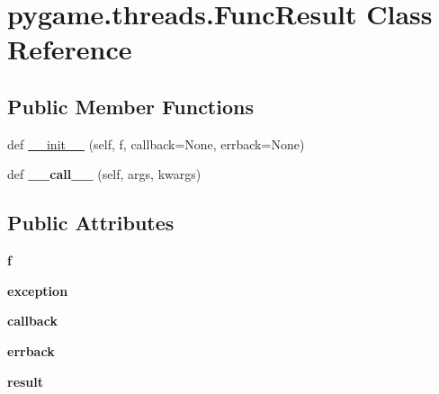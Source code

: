 \hypertarget{classpygame_1_1threads_1_1_func_result}{}\section{pygame.\+threads.\+Func\+Result Class Reference}
\label{classpygame_1_1threads_1_1_func_result}
\subsection*{Public Member Functions}
\begin{DoxyCompactItemize}
\item 
def \hyperlink{classpygame_1_1threads_1_1_func_result_a61e36edc69a58ba0101f7bf1930d62d0}{\+\_\+\+\_\+init\+\_\+\+\_\+} (self, f, callback=None, errback=None)
\item 
\mbox{\label{classpygame_1_1threads_1_1_func_result_a30e5c2698d1765c925e01e44e39acbe7}} 
def {\bfseries \+\_\+\+\_\+call\+\_\+\+\_\+} (self, args, kwargs)
\end{DoxyCompactItemize}
\subsection*{Public Attributes}
\begin{DoxyCompactItemize}
\item 
\mbox{\label{classpygame_1_1threads_1_1_func_result_ae352364c6aa2560303cec3dff9e649f9}} 
{\bfseries f}
\item 
\mbox{\label{classpygame_1_1threads_1_1_func_result_a9d31767c3ab7fe94c0e52719ee255172}} 
{\bfseries exception}
\item 
\mbox{\label{classpygame_1_1threads_1_1_func_result_a01af95e36cd5586fae33f9edcfcf11e2}} 
{\bfseries callback}
\item 
\mbox{\label{classpygame_1_1threads_1_1_func_result_a071d25f9f90d2d06aa718e8417dde1ad}} 
{\bfseries errback}
\item 
\mbox{\label{classpygame_1_1threads_1_1_func_result_a8e25d98a3a03013983c7fd692adab694}} 
{\bfseries result}
\end{DoxyCompactItemize}


